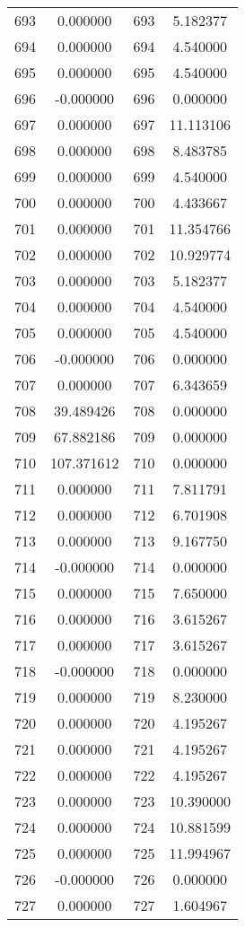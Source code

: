 \documentclass[12pt]{article}
\begin{document}
\begin{longtable}{@{}cccc@{}}
693 & 0.000000 & 693 & 5.182377 \\
694 & 0.000000 & 694 & 4.540000 \\
695 & 0.000000 & 695 & 4.540000 \\
696 & -0.000000 & 696 & 0.000000 \\
697 & 0.000000 & 697 & 11.113106 \\
698 & 0.000000 & 698 & 8.483785 \\
699 & 0.000000 & 699 & 4.540000 \\
700 & 0.000000 & 700 & 4.433667 \\
701 & 0.000000 & 701 & 11.354766 \\
702 & 0.000000 & 702 & 10.929774 \\
703 & 0.000000 & 703 & 5.182377 \\
704 & 0.000000 & 704 & 4.540000 \\
705 & 0.000000 & 705 & 4.540000 \\
706 & -0.000000 & 706 & 0.000000 \\
707 & 0.000000 & 707 & 6.343659 \\
708 & 39.489426 & 708 & 0.000000 \\
709 & 67.882186 & 709 & 0.000000 \\
710 & 107.371612 & 710 & 0.000000 \\
711 & 0.000000 & 711 & 7.811791 \\
712 & 0.000000 & 712 & 6.701908 \\
713 & 0.000000 & 713 & 9.167750 \\
714 & -0.000000 & 714 & 0.000000 \\
715 & 0.000000 & 715 & 7.650000 \\
716 & 0.000000 & 716 & 3.615267 \\
717 & 0.000000 & 717 & 3.615267 \\
718 & -0.000000 & 718 & 0.000000 \\
719 & 0.000000 & 719 & 8.230000 \\
720 & 0.000000 & 720 & 4.195267 \\
721 & 0.000000 & 721 & 4.195267 \\
722 & 0.000000 & 722 & 4.195267 \\
723 & 0.000000 & 723 & 10.390000 \\
724 & 0.000000 & 724 & 10.881599 \\
725 & 0.000000 & 725 & 11.994967 \\
726 & -0.000000 & 726 & 0.000000 \\
727 & 0.000000 & 727 & 1.604967 \\

\end{longtable}
\end{document}
